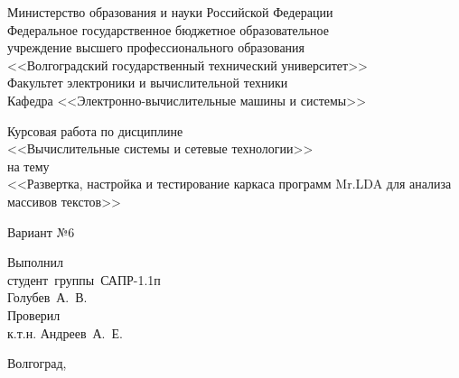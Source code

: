 \begin{titlepage}
    \begin{center}
        Министерство образования и науки Российской Федерации \\
        Федеральное государственное бюджетное образовательное \\
        учреждение высшего профессионального образования \\
        <<Волгоградский государственный технический университет>> \\
        Факультет электроники и вычислительной техники\\
        Кафедра <<Электронно-вычислительные машины и системы>>
    \end{center}
    \vspace{9em}
    \begin{center}
        \large{Курсовая работа}
        по дисциплине\\
        <<Вычислительные системы и сетевые технологии>>\\
        на тему \\
        <<Развертка, настройка и тестирование каркаса программ Mr.LDA для анализа массивов текстов>>
    \end{center}
    \vspace{1em}
    \begin{center}
        Вариант №6
    \end{center}
    \vspace{3em}

    \begin{flushright}
        \begin{minipage}{.40\textwidth}
            Выполнил \\
            студент~группы~САПР-1.1п\\
            Голубев~А.~В.
            \vspace{1em}\\
            Проверил\\
            к.т.н. Андреев~А.~Е.
        \end{minipage}
    \end{flushright}
    \vspace{\fill}
    \begin{center}
        Волгоград, \the\year
    \end{center}
\end{titlepage}